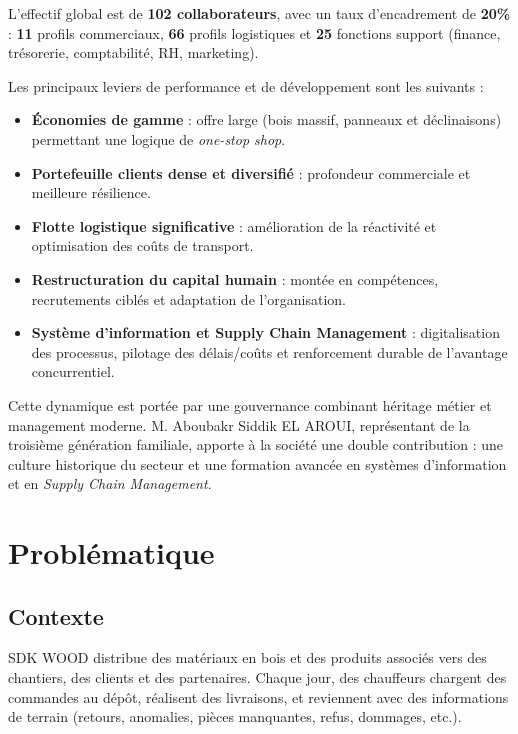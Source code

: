 \documentclass[12pt,a4paper]{article}
\begin{document}
    L'effectif global est de \textbf{102 collaborateurs}, avec un taux d'encadrement de \textbf{20\%} : \textbf{11} profils commerciaux, \textbf{66} profils logistiques et \textbf{25} fonctions support (finance, trésorerie, comptabilité, RH, marketing).

    Les principaux leviers de performance et de développement sont les suivants :
    \begin{itemize}[leftmargin=1.2em]
    \item \textbf{Économies de gamme} : offre large (bois massif, panneaux et déclinaisons) permettant une logique de \textit{one-stop shop}.
    \item \textbf{Portefeuille clients dense et diversifié} : profondeur commerciale et meilleure résilience.
    \item \textbf{Flotte logistique significative} : amélioration de la réactivité et optimisation des coûts de transport.
    \item \textbf{Restructuration du capital humain} : montée en compétences, recrutements ciblés et adaptation de l'organisation.
    \item \textbf{Système d'information et Supply Chain Management} : digitalisation des processus, pilotage des délais/coûts et renforcement durable de l'avantage concurrentiel.
    \end{itemize}

    Cette dynamique est portée par une gouvernance combinant héritage métier et management moderne. M. Aboubakr Siddik EL AROUI, représentant de la troisième génération familiale, apporte à la société une double contribution : une culture historique du secteur et une formation avancée en systèmes d'information et en \textit{Supply Chain Management}.

    \section{Problématique}

    \subsection{Contexte}
    SDK WOOD distribue des matériaux en bois et des produits associés vers des chantiers, des clients et des partenaires. Chaque jour, des chauffeurs chargent des commandes au dépôt, réalisent des livraisons, et reviennent avec des informations de terrain (retours, anomalies, pièces manquantes, refus, dommages, etc.).
\end{document}
